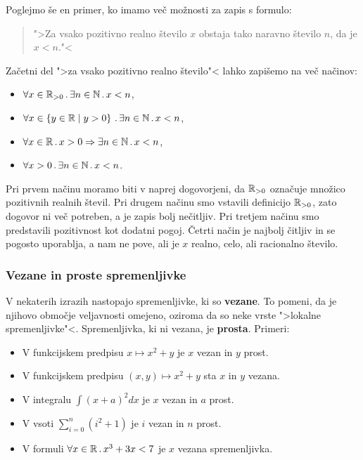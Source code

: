 Poglejmo še en primer, ko imamo več možnosti za zapis s formulo:
%
\begin{quote}
  ">Za vsako pozitivno realno število $x$ obstaja tako naravno število $n$, da je $x < n$."<
\end{quote}
%
Začetni del ">za vsako pozitivno realno število"< lahko zapišemo na več načinov:
%
\begin{itemize}
\item $\forall x \in \mathbb{R}_{> 0} \,.\, \exists n \in \mathbb{N} \,.\, x < n$,
\item $\forall x \in \left\{y \in \mathbb{R} \; \middle| \; y > 0\right\} \,.\, \exists n \in \mathbb{N} \,.\, x < n$,
\item $\forall x \in \mathbb{R} \,.\, x > 0 \Rightarrow \exists n \in \mathbb{N} \,.\, x < n$,
\item $\forall x > 0 \,.\, \exists n \in \mathbb{N} \,.\, x < n$.
\end{itemize}
%
Pri prvem načinu moramo biti v naprej dogovorjeni, da $\mathbb{R}_{> 0}$ označuje množico pozitivnih realnih števil.
Pri drugem načinu smo vstavili definicijo $\mathbb{R}_{> 0}$, zato dogovor ni več potreben, a je zapis bolj nečitljiv.
Pri tretjem načinu smo predstavili pozitivnost kot dodatni pogoj.
Četrti način je najbolj čitljiv in se pogosto uporablja, a nam ne pove, ali je $x$ realno, celo, ali racionalno število.


\subsubsection{Vezane in proste spremenljivke}

V nekaterih izrazih nastopajo spremenljivke, ki so \textbf{vezane}. To pomeni, da je njihovo območje veljavnosti omejeno,
oziroma da so neke vrste ">lokalne spremenljivke"<. Spremenljivka, ki ni vezana, je \textbf{prosta}. Primeri:
%
\begin{itemize}
\item V funkcijskem predpisu $x \mapsto x^2 + y$ je $x$ vezan in $y$ prost.
\item V funkcijskem predpisu $(x,y) \mapsto x^2 + y$ sta $x$ in $y$ vezana.
\item V integralu $\int (x + a)^2 d x$ je $x$ vezan in $a$ prost.
\item V vsoti $\sum_{i=0}^n (i^2 + 1)$ je $i$ vezan in $n$ prost.
\item V formuli $\forall x \in \mathbb{R} \,.\, x^3 + 3 x < 7$ je $x$ vezana spremenljivka.
\end{itemize}

